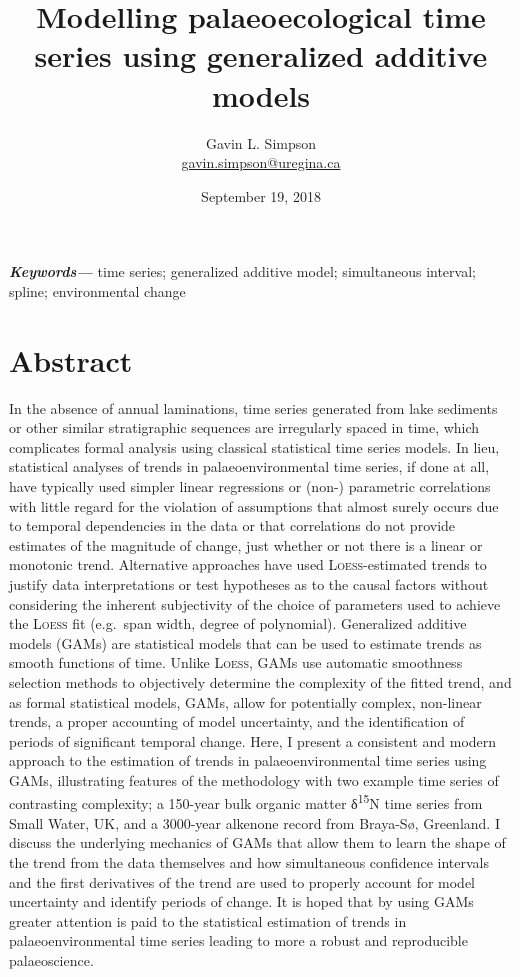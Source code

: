 \documentclass[12pt,]{article}
\title{Modelling palaeoecological time series using generalized additive models}
\author[1]{Gavin L. Simpson\\ \href{mailto:gavin.simpson@uregina.ca}{gavin.simpson@uregina.ca}}
\affil[1]{Institute of Environmental Change and Society, ~University of Regina,
Regina, Saskatchewan, Canada, S4S 0A2}
\date{September 19, 2018}
\newcommand{\loess}{\textsc{Loess}}
\begin{document}
\maketitle

\newcommand*{\keywords}[1]{\textbf{\textit{Keywords---}} #1}
    \keywords{time series; generalized additive model; simultaneous interval; spline;
environmental change}

\makeatletter
\def\fps@figure{tbp}
\makeatother


\section*{Abstract}\label{abstract}

In the absence of annual laminations, time series generated from lake
sediments or other similar stratigraphic sequences are irregularly
spaced in time, which complicates formal analysis using classical
statistical time series models. In lieu, statistical analyses of trends
in palaeoenvironmental time series, if done at all, have typically used
simpler linear regressions or (non-) parametric correlations with little
regard for the violation of assumptions that almost surely occurs due to
temporal dependencies in the data or that correlations do not provide
estimates of the magnitude of change, just whether or not there is a
linear or monotonic trend. Alternative approaches have used
\loess{}-estimated trends to justify data interpretations or test
hypotheses as to the causal factors without considering the inherent
subjectivity of the choice of parameters used to achieve the \loess{}
fit (e.g.~span width, degree of polynomial). Generalized additive models
(GAMs) are statistical models that can be used to estimate trends as
smooth functions of time. Unlike \loess{}, GAMs use automatic smoothness
selection methods to objectively determine the complexity of the fitted
trend, and as formal statistical models, GAMs, allow for potentially
complex, non-linear trends, a proper accounting of model uncertainty,
and the identification of periods of significant temporal change. Here,
I present a consistent and modern approach to the estimation of trends
in palaeoenvironmental time series using GAMs, illustrating features of
the methodology with two example time series of contrasting complexity;
a 150-year bulk organic matter δ\textsuperscript{15}N time series from
Small Water, UK, and a 3000-year alkenone record from Braya-Sø,
Greenland. I discuss the underlying mechanics of GAMs that allow them to
learn the shape of the trend from the data themselves and how
simultaneous confidence intervals and the first derivatives of the trend
are used to properly account for model uncertainty and identify periods
of change. It is hoped that by using GAMs greater attention is paid to
the statistical estimation of trends in palaeoenvironmental time series
leading to more a robust and reproducible palaeoscience.
\end{document}
